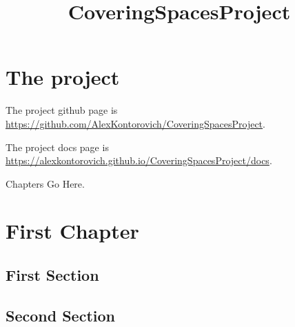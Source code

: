 \usepackage{amsmath, amsthm}
\usepackage{hyperref}

\theoremstyle{definition}
\newtheorem{definition}{Definition}
\newtheorem{theorem}{Theorem}
\newtheorem{proposition}{Proposition}
\newtheorem{lemma}{Lemma}
\newtheorem{corollary}{Corollary}

\title{CoveringSpacesProject}

\newcommand{\eps}{\epsilon}

\newcommand{\R}{\mathbb{R}}
\newcommand{\Q}{\mathbb{Q}}
\newcommand{\C}{\mathbb{C}}
\newcommand{\Z}{\mathbb{Z}}
\newcommand{\N}{\mathbb{N}}



\maketitle

\chapter{The project}

The project github page is \url{https://github.com/AlexKontorovich/CoveringSpacesProject}.

The project docs page is \url{https://alexkontorovich.github.io/CoveringSpacesProject/docs}.

Chapters Go Here.

\chapter{First Chapter}

\section{First Section}


\section{Second Section}



